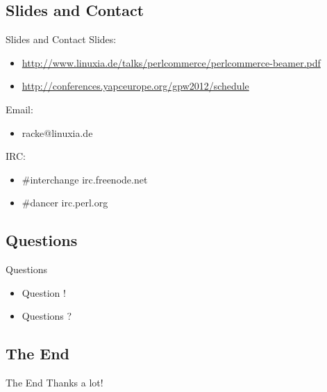 \subsection{Slides and Contact}
\begin{frame}{Slides and Contact}
Slides:
\begin{itemize}
\item \url{http://www.linuxia.de/talks/perlcommerce/perlcommerce-beamer.pdf}
\item \url{http://conferences.yapceurope.org/gpw2012/schedule}
\end{itemize}

Email:
\begin{itemize}
\item racke@linuxia.de
\end{itemize}

IRC:
\begin{itemize}
\item \#interchange irc.freenode.net
\item \#dancer irc.perl.org
\end{itemize}

\end{frame}

\subsection{Questions}
\begin{frame}{Questions}
\begin{itemize}
\item<1> Question !
\item<2> Questions ?
\end{itemize}
\end{frame}

\subsection{The End}
\begin{frame}{The End}
Thanks a lot!
\end{frame}



